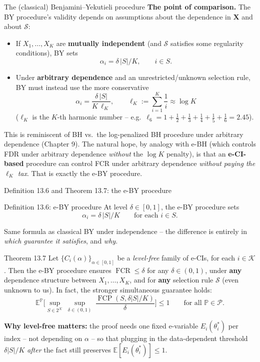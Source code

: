 \documentclass[aspectratio=169,10pt]{beamer}
\newcommand{\E}{\mathbb{E}}
\newcommand{\Pb}{\mathbb{P}}
\newcommand{\calK}{\mathcal{K}}
\newcommand{\calP}{\mathcal{P}}
\newcommand{\calS}{\mathcal{S}}
\DeclareMathOperator{\FCR}{FCR}
\DeclareMathOperator{\FCP}{FCP}
\begin{document}
\begin{frame}{The (classical) Benjamini--Yekutieli procedure}
  \textbf{The point of comparison.} The BY procedure's validity depends on assumptions about the dependence in $\mathbf X$ and about $\calS$:
  \begin{itemize}
    \item If $X_1,\dots,X_K$ are \textbf{mutually independent} (and $\calS$ satisfies some regularity conditions), BY sets
    \[
      \alpha_i = \delta\,|S|/K, \qquad i \in S.
    \]
    \item Under \textbf{arbitrary dependence} and an unrestricted/unknown selection rule, BY must instead use the more conservative
    \[
      \alpha_i = \frac{\delta\,|S|}{K\,\ell_K}, \qquad \ell_K := \sum_{i=1}^K \frac1i \approx \log K
    \]
    ($\ell_K$ is the $K$-th harmonic number -- e.g.\ $\ell_6 = 1+\tfrac12+\tfrac13+\tfrac14+\tfrac15+\tfrac16 = 2.45$).
  \end{itemize}
  This is reminiscent of BH vs.\ the log-penalized BH procedure under arbitrary dependence (Chapter 9). The natural hope, by analogy with e-BH (which controls FDR under arbitrary dependence \emph{without} the $\log K$ penalty), is that an \textbf{e-CI-based} procedure can control FCR under arbitrary dependence \emph{without paying the $\ell_K$ tax}. That is exactly the e-BY procedure.
\end{frame}

\begin{frame}{Definition 13.6 and Theorem 13.7: the e-BY procedure}
  \begin{block}{Definition 13.6: e-BY procedure}
    At level $\delta\in[0,1]$, the e-BY procedure sets
    \[
      \alpha_i = \delta\,|S|/K \qquad \text{for each } i \in S.
    \]
  \end{block}
  Same formula as classical BY under independence -- the difference is entirely in \emph{which guarantee it satisfies}, and \emph{why}.

  \begin{block}{Theorem 13.7}
    Let $\{C_i(\alpha)\}_{\alpha\in[0,1]}$ be a \emph{level-free} family of e-CIs, for each $i \in \calK$. Then the e-BY procedure ensures $\FCR \leq \delta$ for any $\delta\in(0,1)$, under \textbf{any} dependence structure between $X_1,\dots,X_K$, and for \textbf{any} selection rule $\calS$ (even unknown to us). In fact, the stronger simultaneous guarantee holds:
    \[
      \E^{\Pb}\Big[\sup_{S\in2^{\calK}}\ \sup_{\delta\in(0,1)}\ \frac{\FCP(S,\delta|S|/K)}{\delta}\Big] \leq 1 \qquad \text{for all } \Pb\in\calP.
    \]
  \end{block}
  \textbf{Why level-free matters:} the proof needs one fixed e-variable $E_i(\theta_i^*)$ per index -- not depending on $\alpha$ -- so that plugging in the data-dependent threshold $\delta|S|/K$ \emph{after} the fact still preserves $\E[E_i(\theta_i^*)]\leq1$.
\end{frame}
\end{document}
